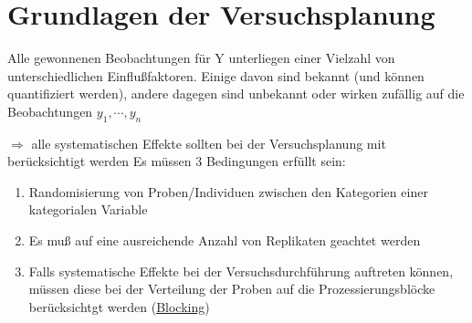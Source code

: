 \chapter{Grundlagen der Versuchsplanung}
Alle gewonnenen Beobachtungen für Y unterliegen einer Vielzahl von unterschiedlichen Einflußfaktoren. Einige davon sind bekannt (und können quantifiziert werden), andere dagegen sind unbekannt oder wirken zufällig auf die Beobachtungen $y_1,\cdots,y_n$ \\

$\Rightarrow$ alle systematischen Effekte sollten bei der Versuchsplanung mit berücksichtigt werden 
Es müssen 3 Bedingungen erfüllt sein:
\begin{enumerate}
	\item Randomisierung von Proben/Individuen zwischen den Kategorien einer kategorialen Variable
	\item Es muß auf eine ausreichende Anzahl von Replikaten geachtet werden
	\item Falls systematische Effekte bei der Versuchsdurchführung auftreten können, müssen diese bei der Verteilung der Proben auf die Prozessierungsblöcke berücksichtgt werden (\underline{Blocking})
\end{enumerate}
